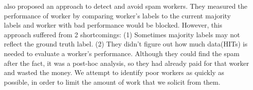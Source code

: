 \documentclass[11pt]{article}
\begin{document}
 also proposed an approach to detect and avoid spam workers. 
They measured the performance of worker by comparing worker's labels to the current majority labels and worker with bad performance would be blocked. However, this approach suffered from 2 shortcomings: (1) Sometimes majority labels may not reflect the ground truth label. (2) They didn't figure out  how much data(HITs) is needed to evaluate a worker's performance. Although they could find the spam after the fact, it was a post-hoc analysis, so they had already paid for that worker and wasted the money.  We attempt to identify poor workers as quickly as possible, in order to limit the amount of work that we solicit from them.



\end{document}
